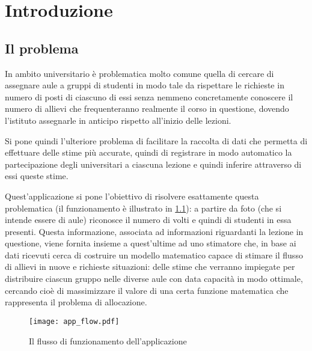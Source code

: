\chapter{Introduzione}
\label{section:intro}

\section{Il problema}
\label{section:problem_section}

In ambito universitario è problematica molto comune quella di cercare di assegnare aule a 
gruppi di studenti in modo tale da rispettare le richieste in numero di posti
di ciascuno di essi senza nemmeno concretamente conoscere il numero di allievi che frequenteranno 
realmente il corso in questione, dovendo l'istituto assegnarle in anticipo rispetto all'inizio
delle lezioni.

Si pone quindi l'ulteriore problema di facilitare la raccolta di dati che permetta di effettuare 
delle stime più accurate, quindi di registrare in modo automatico la partecipazione degli universitari
a ciascuna lezione e quindi inferire attraverso di essi queste stime.

\medskip

Quest'applicazione si pone l'obiettivo di risolvere esattamente questa problematica (il funzionamento è 
illustrato in \ref{fig:app_flow}):
a partire da foto (che si intende essere di aule) riconosce il numero di volti e quindi di studenti in essa 
presenti. Questa informazione, associata ad informazioni riguardanti la lezione in questione, viene fornita 
insieme a quest'ultime ad uno stimatore che, in base ai dati ricevuti cerca di costruire un modello matematico 
capace di stimare il flusso di allievi in nuove e richieste situazioni: delle stime che verranno impiegate 
per distribuire ciascun gruppo nelle diverse aule con data capacità in modo ottimale, cercando cioè di 
massimizzare il valore di una certa funzione matematica che rappresenta il problema di allocazione. 

\begin{figure}
    \begin{small}
        \begin{center}
            \texttt{[image: app\_flow.pdf]}
        \end{center}
        \caption{Il flusso di funzionamento dell'applicazione}
        \label{fig:app_flow}
    \end{small}
\end{figure}

